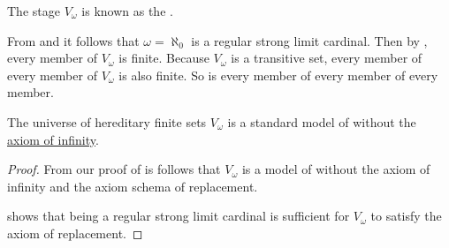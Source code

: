 \begin{definition}\label{def:universe_of_hereditary_finite_sets}
  The stage \( V_\omega \) is known as the .
\end{definition}
\begin{comments}
  \item From  and  it follows that \( \omega = \aleph_0 \) is a regular strong limit cardinal. Then by , every member of \( V_\omega \) is finite. Because \( V_\omega \) is a transitive set, every member of every member of \( V_\omega \) is also finite. So is every member of every member of every member.
\end{comments}

\begin{proposition}\label{thm:cumulative_hierarchy_model_of_zfc_without_infinity}
  The universe of hereditary finite sets \hyperref[def:universe_of_hereditary_finite_sets]{\( V_\omega \)} is a standard model of  without the \hyperref[def:zfc/infinity]{axiom of infinity}.
\end{proposition}
\begin{proof}
  From our proof of  is follows that \( V_\omega \) is a model of  without the axiom of infinity and the axiom schema of replacement.

   shows that being a regular strong limit cardinal is sufficient for \( V_\omega \) to satisfy the axiom of replacement.
\end{proof}

